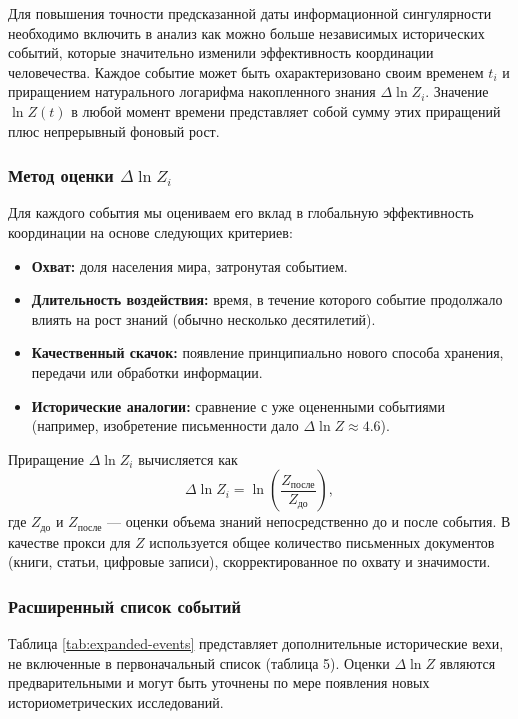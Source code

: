 \documentclass[12pt,a4paper]{article}
\theoremstyle{remark}
\begin{document}
	Для повышения точности предсказанной даты информационной сингулярности необходимо включить в анализ как можно больше независимых исторических событий, которые значительно изменили эффективность координации человечества. Каждое событие может быть охарактеризовано своим временем $t_i$ и приращением натурального логарифма накопленного знания $\Delta \ln Z_i$. Значение $\ln Z(t)$ в любой момент времени представляет собой сумму этих приращений плюс непрерывный фоновый рост.
	
	\subsubsection{Метод оценки $\Delta \ln Z_i$}
	
	Для каждого события мы оцениваем его вклад в глобальную эффективность координации на основе следующих критериев:
	\begin{itemize}
		\item \textbf{Охват:} доля населения мира, затронутая событием.
		\item \textbf{Длительность воздействия:} время, в течение которого событие продолжало влиять на рост знаний (обычно несколько десятилетий).
		\item \textbf{Качественный скачок:} появление принципиально нового способа хранения, передачи или обработки информации.
		\item \textbf{Исторические аналогии:} сравнение с уже оцененными событиями (например, изобретение письменности дало $\Delta \ln Z \approx 4.6$).
	\end{itemize}
	Приращение $\Delta \ln Z_i$ вычисляется как
	\[
	\Delta \ln Z_i = \ln\left(\frac{Z_{\text{после}}}{Z_{\text{до}}}\right),
	\]
	где $Z_{\text{до}}$ и $Z_{\text{после}}$ — оценки объема знаний непосредственно до и после события. В качестве прокси для $Z$ используется общее количество письменных документов (книги, статьи, цифровые записи), скорректированное по охвату и значимости.
	
	\subsubsection{Расширенный список событий}
	
	Таблица \ref{tab:expanded-events} представляет дополнительные исторические вехи, не включенные в первоначальный список (таблица 5). Оценки $\Delta \ln Z$ являются предварительными и могут быть уточнены по мере появления новых историометрических исследований.
	
\end{document}
